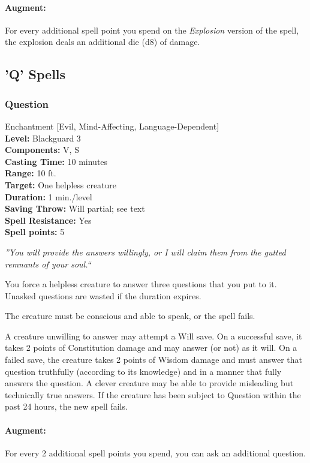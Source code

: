 \paragraph{Augment:} For every additional spell point you spend on the \emph{Explosion} version of the spell, the explosion deals an additional die (d8) of damage.
\subsection{'Q' Spells}
\subsubsection{Question}
\label{Spell:Question}
Enchantment [Evil, Mind-Affecting, Language-Dependent]
\\ \textbf{Level:} Blackguard 3
\\ \textbf{Components:} V, S
\\ \textbf{Casting Time:} 10 minutes
\\ \textbf{Range:} 10 ft.
\\ \textbf{Target:} One helpless creature
\\ \textbf{Duration:} 1 min./level
\\ \textbf{Saving Throw:} Will partial; see text
\\ \textbf{Spell Resistance:} Yes
\\ \textbf{Spell points:} 5

\emph{''You will provide the answers willingly, or I will claim them from the gutted remnants of your soul.``}

You force a helpless creature to answer three questions that you put to it. Unasked questions are wasted if the duration expires.

The creature must be conscious and able to speak, or the spell fails.

A creature unwilling to answer may attempt a Will save. On a successful save, it takes 2 points of Constitution damage and may answer (or not) as it will. On a failed save, the creature takes 2 points of Wisdom damage and must answer that question truthfully (according to its knowledge) and in a manner that fully answers the question. A clever creature may be able to provide misleading but technically true answers. If the creature has been subject to Question within the past 24 hours, the new spell fails. 

\paragraph{Augment:} For every 2 additional spell points you spend, you can ask an additional question.
